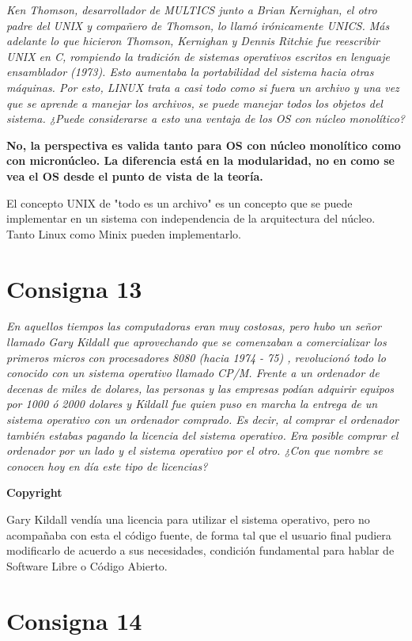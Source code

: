 \documentclass[11pt]{article}
\begin{document}
\emph{Ken Thomson, desarrollador de MULTICS junto a Brian Kernighan, el otro
padre del UNIX y compañero de Thomson, lo llamó irónicamente UNICS. Más adelante
lo que hicieron Thomson, Kernighan y Dennis Ritchie fue reescribir UNIX en C,
rompiendo la tradición de sistemas operativos escritos en lenguaje ensamblador
(1973). Esto aumentaba la portabilidad del sistema hacia otras máquinas. Por
esto, LINUX trata a casi todo como si fuera un archivo y una vez que se aprende
a manejar los archivos, se puede manejar todos los objetos del sistema. ¿Puede
considerarse a esto una ventaja de los OS con núcleo monolítico?}

\textbf{No, la perspectiva es valida tanto para OS con núcleo monolítico como
con micronúcleo. La diferencia está en la modularidad, no en como se vea el OS
desde el punto de vista de la teoría.}

El concepto UNIX de "todo es un archivo" es un concepto que se puede implementar 
en un sistema con independencia de la arquitectura del núcleo. Tanto Linux como 
Minix pueden implementarlo.

\section*{Consigna 13}

\emph{En aquellos tiempos las computadoras eran muy costosas, pero hubo un señor
llamado Gary Kildall que aprovechando que se comenzaban a comercializar los
primeros micros con procesadores 8080 (hacia 1974 - 75) , revolucionó todo lo
conocido con un sistema operativo llamado CP/M. Frente a un ordenador de decenas
de miles de dolares, las personas y las empresas podían adquirir equipos por
1000 ó 2000 dolares y Kildall fue quien puso en marcha la entrega de un sistema
operativo con un ordenador comprado.  Es decir, al comprar el ordenador también
estabas pagando la licencia del sistema operativo. Era posible comprar el
ordenador por un lado y el sistema operativo por el otro. ¿Con que nombre se
conocen hoy en día este tipo de licencias?}

\textbf{Copyright}

Gary Kildall vendía una licencia para utilizar el sistema operativo, pero no 
acompañaba con esta el código fuente, de forma tal que el usuario final pudiera
modificarlo de acuerdo a sus necesidades, condición fundamental para hablar de 
Software Libre o Código Abierto.

\section*{Consigna 14}
\end{document}
